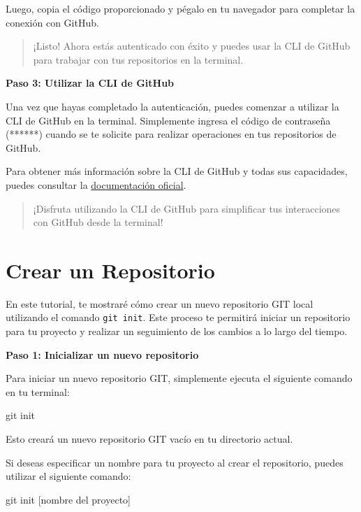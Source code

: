 \documentclass[
  letterpaper,
  DIV=11,
  numbers=noendperiod]{scrartcl}
\newenvironment{Shaded}{}{}
\newcommand{\FunctionTok}[1]{\textcolor[rgb]{0.44,0.26,0.76}{#1}}
\newcommand{\NormalTok}[1]{\textcolor[rgb]{0.14,0.16,0.18}{#1}}
\begin{document}
Luego, copia el código proporcionado y pégalo en tu navegador para
completar la conexión con GitHub.

\begin{quote}
¡Listo! Ahora estás autenticado con éxito y puedes usar la CLI de GitHub
para trabajar con tus repositorios en la terminal.
\end{quote}

\textbf{Paso 3: Utilizar la CLI de GitHub}

Una vez que hayas completado la autenticación, puedes comenzar a
utilizar la CLI de GitHub en la terminal. Simplemente ingresa el código
de contraseña (******) cuando se te solicite para realizar operaciones
en tus repositorios de GitHub.

Para obtener más información sobre la CLI de GitHub y todas sus
capacidades, puedes consultar la
\href{https://cli.github.com/}{documentación oficial}.

\begin{quote}
¡Disfruta utilizando la CLI de GitHub para simplificar tus interacciones
con GitHub desde la terminal!
\end{quote}

\hypertarget{crear-un-repositorio}{%
\section{Crear un Repositorio}\label{crear-un-repositorio}}

En este tutorial, te mostraré cómo crear un nuevo repositorio GIT local
utilizando el comando \texttt{git\ init}. Este proceso te permitirá
iniciar un repositorio para tu proyecto y realizar un seguimiento de los
cambios a lo largo del tiempo.

\textbf{Paso 1: Inicializar un nuevo repositorio}

Para iniciar un nuevo repositorio GIT, simplemente ejecuta el siguiente
comando en tu terminal:

\begin{Shaded}
\begin{Highlighting}[]
\FunctionTok{git}\NormalTok{ init}
\end{Highlighting}
\end{Shaded}

Esto creará un nuevo repositorio GIT vacío en tu directorio actual.

Si deseas especificar un nombre para tu proyecto al crear el
repositorio, puedes utilizar el siguiente comando:

\begin{Shaded}
\begin{Highlighting}[]
\FunctionTok{git}\NormalTok{ init [nombre del proyecto]}
\end{Highlighting}
\end{Shaded}
\end{document}

